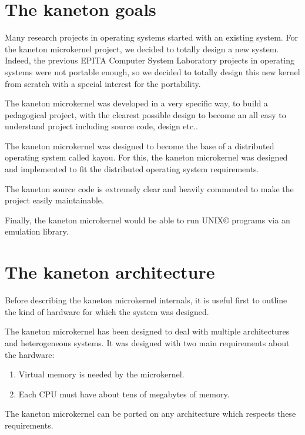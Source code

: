 \begin{multicols}{2}
%
%

\section{The kaneton goals}

Many research projects in operating systems started with an existing system.
For the kaneton microkernel project, we decided to totally design a
new system. Indeed, the previous EPITA Computer System Laboratory projects in
operating systems were not portable enough, so we decided to totally design
this new kernel from scratch with a special interest for the portability.

The kaneton microkernel was developed in a very specific way, to build
a pedagogical project, with the clearest possible design to become an
all easy to understand project including source code, design etc..

The kaneton microkernel was designed to become the base of a distributed
operating system called kayou. For this, the kaneton microkernel was designed
and implemented to fit the distributed operating system requirements.

The kaneton source code is extremely clear and heavily commented to make the
project easily maintainable.

Finally, the kaneton microkernel would be able to run
UNIX{\scriptsize \copyright} programs via an emulation library.

%
%

\section{The kaneton architecture}

Before describing the kaneton microkernel internals, it is useful first to
outline the kind of hardware for which the system was designed.

The kaneton microkernel has been designed to deal with multiple architectures
and heterogeneous systems. It was designed with two main requirements about the
hardware:

\begin{enumerate}
  \item
    Virtual memory is needed by the microkernel.
  \item
    Each CPU must have about tens of megabytes of memory.
\end{enumerate}

The kaneton microkernel can be ported on any architecture which respects these
requirements.


\end{multicols}
